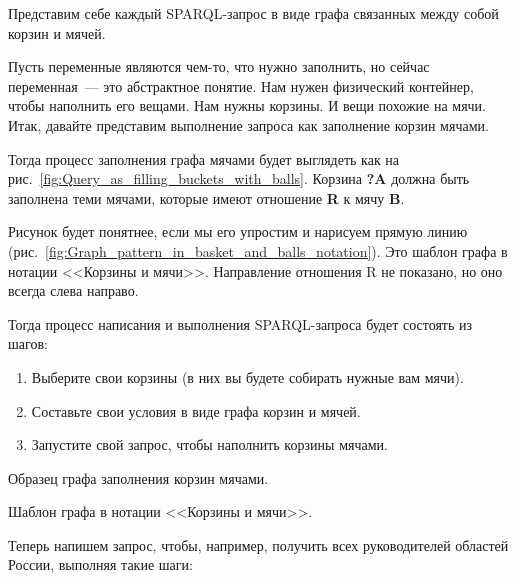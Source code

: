 Представим себе каждый SPARQL-запрос в виде графа связанных между собой корзин и мячей.

Пусть переменные являются чем-то, что нужно заполнить, но сейчас переменная~--- это абстрактное понятие. Нам нужен физический контейнер, чтобы наполнить его вещами. Нам нужны корзины. И вещи похожие на мячи. Итак, давайте представим выполнение запроса как заполнение корзин мячами.

Тогда процесс заполнения графа мячами будет выглядеть как на рис.~\ref{fig:Query_as_filling_buckets_with_balls}. Корзина \textbf{?A} должна быть заполнена теми мячами, которые имеют отношение \textbf{R} к мячу \textbf{B}.

Рисунок будет понятнее, если мы его упростим и нарисуем прямую линию (рис.~\ref{fig:Graph_pattern_in_basket_and_balls_notation}). Это шаблон графа в нотации <<Корзины и мячи>>. Направление отношения R не показано, но оно всегда слева направо.

\newpage
Тогда процесс написания и выполнения SPARQL-запроса будет состоять из шагов:
\begin{enumerate}
    \item Выберите свои корзины (в них вы будете собирать нужные вам мячи).
    \item Составьте свои условия в виде графа корзин и мячей.
    \item Запустите свой запрос, чтобы наполнить корзины мячами.
\end{enumerate}

\begin{marginfigure}[-4cm]
	{
		\setlength{\fboxsep}{0pt}%
		\setlength{\fboxrule}{1pt}%
	}
    \caption{Образец графа заполнения корзин мячами.}
	\label{fig:Query_as_filling_buckets_with_balls}
\end{marginfigure}

\begin{marginfigure}
	{
		\setlength{\fboxsep}{0pt}%
		\setlength{\fboxrule}{1pt}%
	}
    \caption{Шаблон графа в нотации <<Корзины и мячи>>.}
	\label{fig:Graph_pattern_in_basket_and_balls_notation}
\end{marginfigure}

Теперь напишем запрос, чтобы, например, получить всех руководителей областей России, выполняя такие шаги:


